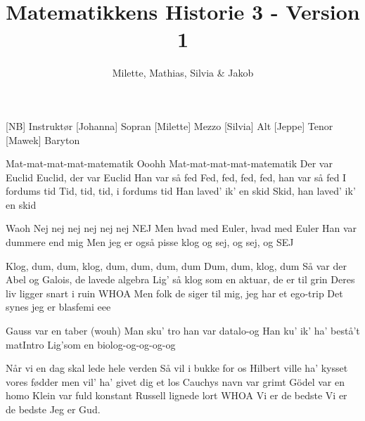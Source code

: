 \documentclass[a4paper,11pt]{article}
\title{Matematikkens Historie 3 - Version 1}
\author{Milette, Mathias, Silvia \& Jakob}
\begin{document}
\maketitle

\begin{roles}
[NB] Instruktør
[Johanna] Sopran
[Milette] Mezzo
[Silvia] Alt
[Jeppe] Tenor
[Mawek] Baryton
\end{roles}

\begin{song}


 Mat-mat-mat-mat-matematik
Ooohh
 Mat-mat-mat-mat-matematik
 Der var Euclid
 Euclid, der var Euclid
 Han var så fed
 Fed, fed, fed, fed, han var så fed
 I fordums tid
 Tid, tid, tid, i fordums tid
 Han laved' ik' en skid
 Skid, han laved' ik' en skid

\sings{} Waoh
Nej nej nej nej nej nej NEJ
Men hvad med Euler, hvad med Euler
Han var dummere end mig
Men jeg er også pisse klog og sej, og sej, og SEJ

 Klog, dum, dum, klog, dum, dum, dum, dum
 Dum, dum, klog, dum
 Så var der Abel og Galois, de lavede algebra
Lig' så klog som en aktuar, de er til grin
Deres liv ligger snart i ruin
WHOA
Men folk de siger til mig, jeg har et ego-trip
Det synes jeg er blasfemi
eee

\sings{} Gauss var en taber (wouh)
Man sku' tro han var datalo-og
Han ku' ik' ha' bestå't matIntro
Lig'som en biolog-og-og-og-og

\sings{} Når vi en dag skal lede hele verden
Så vil i bukke for os
Hilbert ville ha' kysset vores fødder
men vil' ha' givet dig et los
Cauchys navn var grimt
Gödel var en homo
Klein var fuld konstant
Russell lignede lort
WHOA
Vi er de bedste
Vi er de bedste
Jeg er Gud.
\end{song}
\end{document}
